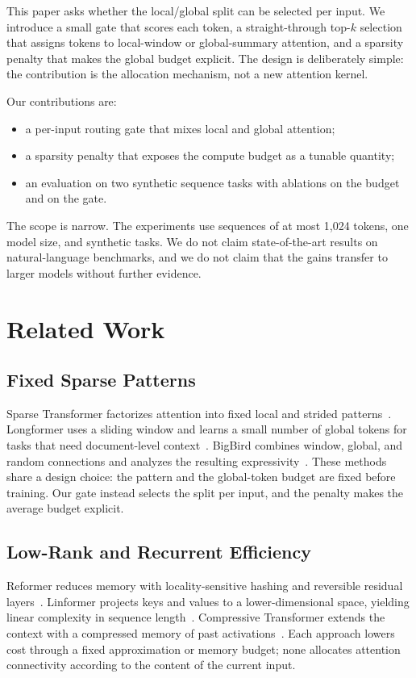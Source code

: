 \documentclass[10pt]{article}
\begin{document}
This paper asks whether the local/global split can be selected per input. We introduce a small gate that scores each token, a straight-through top-$k$ selection that assigns tokens to local-window or global-summary attention, and a sparsity penalty that makes the global budget explicit. The design is deliberately simple: the contribution is the allocation mechanism, not a new attention kernel.

Our contributions are:
\begin{itemize}
  \item a per-input routing gate that mixes local and global attention;
  \item a sparsity penalty that exposes the compute budget as a tunable quantity;
  \item an evaluation on two synthetic sequence tasks with ablations on the budget and on the gate.
\end{itemize}

The scope is narrow. The experiments use sequences of at most 1{,}024 tokens, one model size, and synthetic tasks. We do not claim state-of-the-art results on natural-language benchmarks, and we do not claim that the gains transfer to larger models without further evidence.

\section{Related Work}
\label{sec:related_work}
\subsection{Fixed Sparse Patterns}
\label{sec:fixed_sparse}
Sparse Transformer factorizes attention into fixed local and strided patterns~\cite{Child2019Generating}. Longformer uses a sliding window and learns a small number of global tokens for tasks that need document-level context~\cite{Beltagy2020Longformer}. BigBird combines window, global, and random connections and analyzes the resulting expressivity~\cite{Zaheer2020Big}. These methods share a design choice: the pattern and the global-token budget are fixed before training. Our gate instead selects the split per input, and the penalty makes the average budget explicit.

\subsection{Low-Rank and Recurrent Efficiency}
\label{sec:low_rank}
Reformer reduces memory with locality-sensitive hashing and reversible residual layers~\cite{Kitaev2020Reformer}. Linformer projects keys and values to a lower-dimensional space, yielding linear complexity in sequence length~\cite{Wang2020Linformer}. Compressive Transformer extends the context with a compressed memory of past activations~\cite{Rae2020Compressive}. Each approach lowers cost through a fixed approximation or memory budget; none allocates attention connectivity according to the content of the current input.
\end{document}
